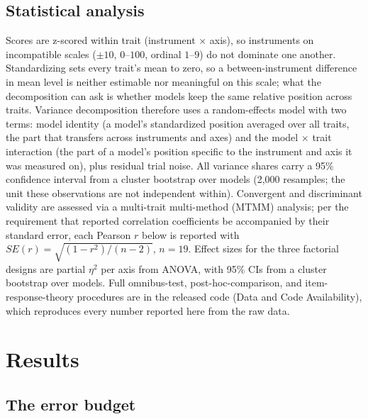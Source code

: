 \documentclass[12pt]{article}
\begin{document}
\subsection{Statistical analysis}
\label{sec:stats}

Scores are z-scored within trait (instrument $\times$ axis), so
instruments on incompatible scales ($\pm10$, $0$--$100$, ordinal $1$--$9$)
do not dominate one another. Standardizing sets every trait's mean to zero,
so a between-instrument difference in mean level is neither estimable nor
meaningful on this scale; what the decomposition can ask is whether models
keep the same relative position across traits. Variance decomposition
therefore uses a random-effects model with two terms: model identity (a
model's standardized position averaged over all traits, the part that
transfers across instruments and axes) and the model $\times$ trait
interaction (the part of a model's position specific to the instrument and
axis it was measured on), plus residual trial noise. All variance shares
carry a 95\% confidence interval from a cluster bootstrap over models
(2,000 resamples; the unit these observations are not independent within). Convergent and discriminant validity are assessed via
a multi-trait multi-method (MTMM) analysis; per the requirement that
reported correlation coefficients be accompanied by their standard error,
each Pearson $r$ below is reported with $SE(r)=\sqrt{(1-r^2)/(n-2)}$,
$n=19$. Effect sizes for the three factorial designs are partial $\eta^2$
per axis from ANOVA, with 95\% CIs from a cluster bootstrap over models.
Full omnibus-test, post-hoc-comparison, and item-response-theory procedures
are in the released code (Data and Code Availability), which reproduces
every number reported here from the raw data.

\section{Results}

\subsection{The error budget}
\label{sec:error-budget}
\end{document}
